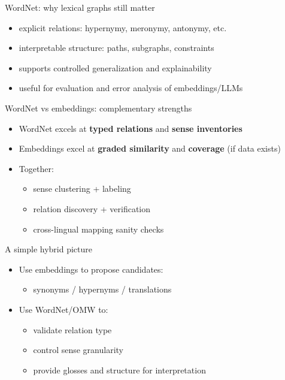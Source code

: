 \documentclass{beamer}
\begin{document}
\begin{frame}{WordNet: why lexical graphs still matter}
\begin{itemize}
  \item explicit relations: hypernymy, meronymy, antonymy, etc.
  \item interpretable structure: paths, subgraphs, constraints
  \item supports controlled generalization and explainability
  \item useful for evaluation and error analysis of embeddings/LLMs
\end{itemize}
\end{frame}

\begin{frame}{WordNet vs embeddings: complementary strengths}
\begin{itemize}
  \item WordNet excels at \textbf{typed relations} and \textbf{sense inventories}
  \item Embeddings excel at \textbf{graded similarity} and \textbf{coverage} (if data exists)
  \item Together:
  \begin{itemize}
    \item sense clustering + labeling
    \item relation discovery + verification
    \item cross-lingual mapping sanity checks
  \end{itemize}
\end{itemize}
\end{frame}

\begin{frame}{A simple hybrid picture}
\begin{itemize}
  \item Use embeddings to propose candidates:
  \begin{itemize}
    \item synonyms / hypernyms / translations
  \end{itemize}
  \item Use WordNet/OMW to:
  \begin{itemize}
    \item validate relation type
    \item control sense granularity
    \item provide glosses and structure for interpretation
  \end{itemize}
\end{itemize}
\end{frame}
\end{document}
